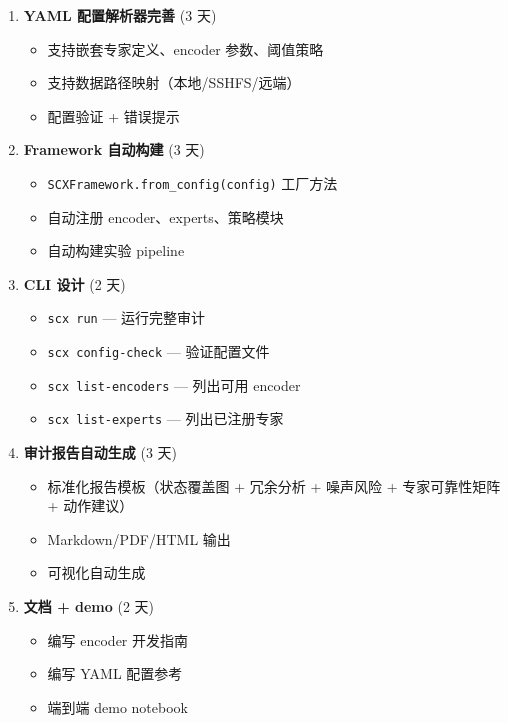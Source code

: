 \documentclass[
  12pt,
]{ctexart}
\providecommand{\tightlist}{%
  \setlength{\itemsep}{0pt}\setlength{\parskip}{0pt}}
\begin{document}
\begin{enumerate}
\def\labelenumi{\arabic{enumi}.}
\tightlist
\item
  \textbf{YAML 配置解析器完善} (3 天)

  \begin{itemize}
  \tightlist
  \item
    支持嵌套专家定义、encoder 参数、阈值策略
  \item
    支持数据路径映射（本地/SSHFS/远端）
  \item
    配置验证 + 错误提示
  \end{itemize}
\item
  \textbf{Framework 自动构建} (3 天)

  \begin{itemize}
  \tightlist
  \item
    \texttt{SCXFramework.from\_config(config)} 工厂方法
  \item
    自动注册 encoder、experts、策略模块
  \item
    自动构建实验 pipeline
  \end{itemize}
\item
  \textbf{CLI 设计} (2 天)

  \begin{itemize}
  \tightlist
  \item
    \texttt{scx\ run} --- 运行完整审计
  \item
    \texttt{scx\ config-check} --- 验证配置文件
  \item
    \texttt{scx\ list-encoders} --- 列出可用 encoder
  \item
    \texttt{scx\ list-experts} --- 列出已注册专家
  \end{itemize}
\item
  \textbf{审计报告自动生成} (3 天)

  \begin{itemize}
  \tightlist
  \item
    标准化报告模板（状态覆盖图 + 冗余分析 + 噪声风险 + 专家可靠性矩阵 +
    动作建议）
  \item
    Markdown/PDF/HTML 输出
  \item
    可视化自动生成
  \end{itemize}
\item
  \textbf{文档 + demo} (2 天)

  \begin{itemize}
  \tightlist
  \item
    编写 encoder 开发指南
  \item
    编写 YAML 配置参考
  \item
    端到端 demo notebook
  \end{itemize}
\end{enumerate}
\end{document}
